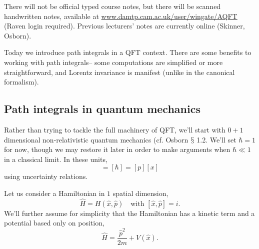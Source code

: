 \begin{note}
There will not be official typed course notes, but there will be scanned handwritten notes, available at \url{www.damtp.cam.ac.uk/user/wingate/AQFT} (Raven login required). Previous lecturers' notes are currently online (Skinner, Osborn).
\end{note}

Today we introduce path integrals in a QFT context. There are some benefits to working with path integrals-- some computations are simplified or more straightforward, and Lorentz invariance is manifest (unlike in the canonical formalism).

\subsection*{Path integrals in quantum mechanics} Rather than trying to tackle the full machinery of QFT, we'll start with $0+1$ dimensional non-relativistic quantum mechanics (cf. Osborn $\mathsection$ 1.2. We'll set $\hbar = 1$ for now, though we may restore it later in order to make arguments when $\hbar \ll 1$ in a classical limit. In these units,
\begin{equation*}
    [E][t]=[\hbar]=[p][x]
\end{equation*}
using uncertainty relations.

Let us consider a Hamiltonian in $1$ spatial dimension,
\begin{equation*}
    \hat H=H(\hat x, \hat p)\quad \text{with }[\hat x,\hat p]=i.
\end{equation*}
We'll further assume for simplicity that the Hamiltonian has a kinetic term and a potential based only on position,
\begin{equation*}
    \hat H= \frac{\hat p^2}{2m}+V(\hat x).
\end{equation*}

